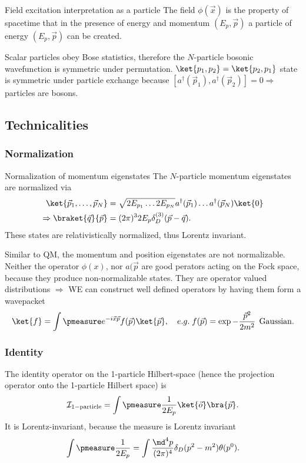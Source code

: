 \begin{mybox}{Field excitation interpretation as a particle}
	The field $\phi(\vec{x})$ is the property of spacetime that in the presence of energy and momentum $(E_p,\vec{p})$ a particle of energy $(E_p, \vec{p})$ can be created.
\end{mybox}
Scalar particles obey Bose statistics, therefore the $N$-particle bosonic wavefunction is symmetric under permutation.
$\ket{p_1,p_2}=\ket{p_2,p_1}$ state is symmetric under particle exchange because $\left[a^{\dagger}(\vec{p}_1), a^{\dagger}(\vec{p}_2)\right]=0 \Rightarrow$ particles are bosons.

\subsection{Technicalities}
\subsubsection{Normalization}
\begin{mybox}{Normalization of momentum eigenstates}
The $N$-particle momentum eigenstates are normalized via 
\begin{align}
	\ket{\vec{p}_1,\dots,\vec{p}_N} &= \sqrt{2 E_{p_1} \dots 2 E_{p_N}} a^{\dagger}(\vec{p}_1) \dots a^{\dagger}(\vec{p}_N) \ket{0}\\
	\Rightarrow \braket{\vec{q}}{\vec{p}} &= (2 \pi)^3 2 E_p \delta^{(3)}_D (\vec{p}-\vec{q}).
\end{align}
These states are relativistically normalized, thus Lorentz invariant.
\end{mybox}
Similar to QM, the momentum and position eigenstates are not normalizable. Neither the operator $\phi(x)$, nor $a(\vec{p}$ are good perators acting on the Fock space, because they produce non-normalizable states. They are operator valued distributions $\Rightarrow$ WE can construct well defined operators by having them form a wavepacket 
\begin{equation}
\ket{f}=\int \pmeasure e^{-i \vec{x} \vec{p}} f(\vec{p}) \ket{\vec{p}}, \quad e.g. \; f(\vec{p})=\exp{- \frac{\vec{p}^2}{2m^2}} \;\, \mathrm{Gaussian}.
\end{equation}

\subsubsection{Identity} The identity operator on the 1-particle Hilbert-space (hence the projection operator onto the 1-particle Hilbert space) is 
\begin{equation}
	\mathcal{I}_{1-\mathrm{particle}} = \int \pmeasure \frac{1}{2 E_p} \ket{\vec{o}} \bra{\vec{p}}.
\end{equation}
It is Lorentz-invariant, because the measure is Lorentz invariant 
\begin{equation}
	\int \pmeasure \frac{1}{2 E_p} = \int \frac{\md^4 p}{(2 \pi)^4} \delta_D(p^2-m^2) \theta(p^0).
\end{equation}

